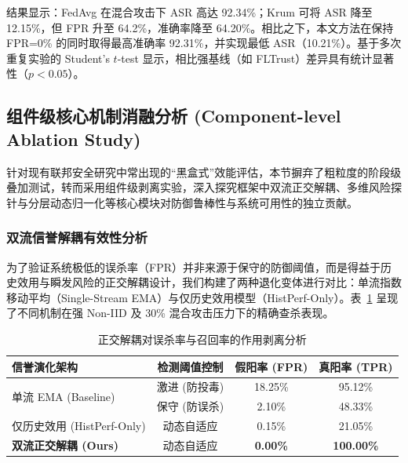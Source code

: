\documentclass[11pt, a4paper, UTF8, fontset=fandol]{ctexart}
\begin{document}
结果显示：FedAvg 在混合攻击下 ASR 高达 92.34\%；Krum 可将 ASR 降至 12.15\%，但 FPR 升至 64.2\%，准确率降至 64.20\%。相比之下，本文方法在保持 FPR=0\% 的同时取得最高准确率 92.31\%，并实现最低 ASR（10.21\%）。基于多次重复实验的 Student's $t$-test 显示，相比强基线（如 FLTrust）差异具有统计显著性（$p<0.05$）。

\subsection{组件级核心机制消融分析 (Component-level Ablation Study)}
针对现有联邦安全研究中常出现的“黑盒式”效能评估，本节摒弃了粗粒度的阶段级叠加测试，转而采用组件级剥离实验，深入探究框架中双流正交解耦、多维风险探针与分层动态归一化等核心模块对防御鲁棒性与系统可用性的独立贡献。

\subsubsection{双流信誉解耦有效性分析}
为了验证系统极低的误杀率（FPR）并非来源于保守的防御阈值，而是得益于历史效用与瞬发风险的正交解耦设计，我们构建了两种退化变体进行对比：单流指数移动平均（Single-Stream EMA）与仅历史效用模型（HistPerf-Only）。表~\ref{tab:ablation_stream} 呈现了不同机制在强 Non-IID 及 30\% 混合攻击压力下的精确查杀表现。

\begin{table}[htbp]
    \centering
    \caption{正交解耦对误杀率与召回率的作用剥离分析}
    \label{tab:ablation_stream}
    \begin{tabular}{l c c c}
        \toprule
        \textbf{信誉演化架构}                & \textbf{检测阈值控制} & \textbf{假阳率 (FPR)} & \textbf{真阳率 (TPR)} \\
        \midrule
        \multirow{2}{*}{单流 EMA (Baseline)} & 激进 (防投毒)         & 18.25\%               & 95.12\%               \\
                                             & 保守 (防误杀)         & 2.10\%                & 48.33\%               \\
        \midrule
        仅历史效用 (HistPerf-Only)           & 动态自适应            & 0.15\%                & 21.05\%               \\
        \textbf{双流正交解耦 (Ours)}         & 动态自适应            & \textbf{0.00\%}       & \textbf{100.00\%}     \\
        \bottomrule
    \end{tabular}
\end{table}
\end{document}
